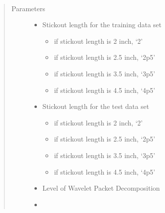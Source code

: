 \documentclass[letterpaper,10pt,english]{sphinxmanual}
\begin{document}
\begin{fulllineitems}
\label{\detokenize{WPT:WPT_Transfer_Learning.WPT_Transfer_Learning}}~\begin{quote}\begin{description}
\item[{Parameters}] \leavevmode\begin{itemize}
\item {} 
 \textendash{} 
Stickout length for the training data set
\begin{itemize}
\item {} 
if stickout length is 2 inch, ‘2’

\item {} 
if stickout length is 2.5 inch, ‘2p5’

\item {} 
if stickout length is 3.5 inch, ‘3p5’

\item {} 
if stickout length is 4.5 inch, ‘4p5’

\end{itemize}


\item {} 
 \textendash{} 
Stickout length for the test data set
\begin{itemize}
\item {} 
if stickout length is 2 inch, ‘2’

\item {} 
if stickout length is 2.5 inch, ‘2p5’

\item {} 
if stickout length is 3.5 inch, ‘3p5’

\item {} 
if stickout length is 4.5 inch, ‘4p5’

\end{itemize}


\item {} 
 \textendash{} Level of Wavelet Packet Decomposition

\item {} 
 \textendash{} \begin{quote}


\end{quote}
\end{itemize}
\end{description}
\end{quote}
\end{fulllineitems}
\end{document}
